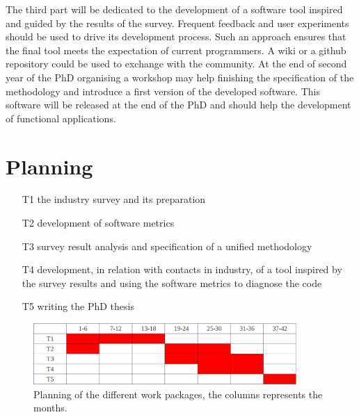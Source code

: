 \documentclass[12p]{article}
\begin{document}
The third part will be dedicated to the development of a software tool
inspired and guided by the results of the survey. Frequent feedback
and user experiments should be used to drive its development
process. Such an approach ensures that the final tool meets the
expectation of current programmers. A wiki or a github repository
could be used to exchange with the community. At the end of second
year of the PhD organising a workshop may help finishing the
specification of the methodology and introduce a first version of the
developed software. This software will be released at the end of the
PhD and should help the development of functional applications.






\section*{Planning}

\begin{itemize}
\item[T1] the industry survey and its preparation
\item[T2] development of software metrics
\item[T3] survey result analysis and specification of a unified
  methodology
\item[T4] development, in relation with contacts in industry, of
  a tool inspired by the survey results and using the software metrics
  to diagnose the code
\item[T5] writing the PhD thesis
\end{itemize}


\begin{figure}[h]


\centering
\includegraphics[width = 10cm]{planning.eps}
\caption{Planning of the different work packages, the columns represents the months.}
\label{fig:planning}
\end{figure}




\end{document}
